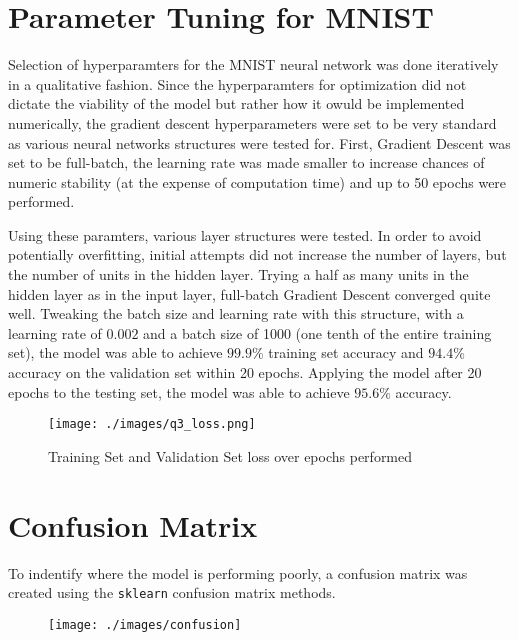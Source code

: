 \documentclass{article}
\begin{document}
\section{Parameter Tuning for MNIST}
Selection of hyperparamters for the MNIST neural network was done iteratively in a qualitative fashion. Since the hyperparamters for optimization did not dictate the viability of the model but rather how it owuld be implemented numerically, the gradient descent hyperparameters were set to be very standard as various neural networks structures were tested for. First, Gradient Descent was set to be full-batch, the learning rate was made smaller to increase chances of numeric stability (at the expense of computation time) and up to 50 epochs were performed.

Using these paramters, various layer structures were tested. In order to avoid potentially overfitting, initial attempts did not increase the number of layers, but the number of units in the hidden layer. Trying a half as many units in the hidden layer as in the input layer, full-batch Gradient Descent converged quite well. Tweaking the batch size and learning rate with this structure, with a learning rate of $0.002$ and a batch size of 1000 (one tenth of the entire training set), the model was able to achieve $99.9\%$ training set accuracy and $94.4\%$ accuracy on the validation set within 20 epochs. Applying the model after 20 epochs to the testing set, the model was able to achieve $95.6\%$ accuracy.

\begin{figure} [H]
\begin{center}
\texttt{[image: ./images/q3\_loss.png]}
\caption{Training Set and Validation Set loss over epochs performed}
\end{center}
\end{figure}

\newpage
\section{Confusion Matrix}
To indentify where the model is performing poorly, a confusion matrix was created using the \verb+sklearn+ confusion matrix methods.

\begin{figure}
\begin{center}
\texttt{[image: ./images/confusion]}
\end{center}
\end{figure}
\end{document}
